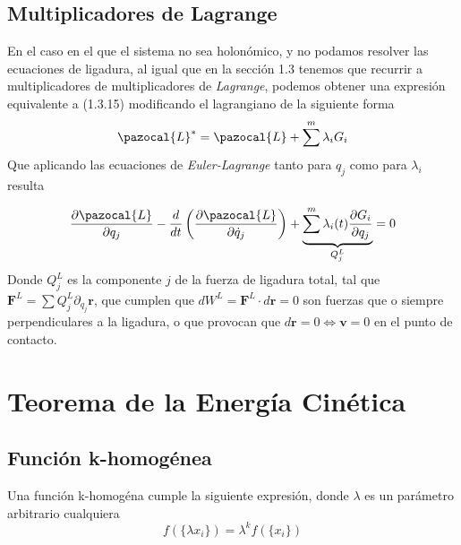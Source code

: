 \subsection{Multiplicadores de Lagrange}
En el caso en el que el sistema no sea holonómico, y no podamos resolver las ecuaciones de ligadura, al igual que en la sección 1.3 tenemos que recurrir a multiplicadores de multiplicadores de \textit{Lagrange}, podemos obtener una expresión equivalente a (1.3.15) modificando el lagrangiano de la siguiente forma
\begin{equation} \label{2.3.4}
    \pazocal{L}^* = \pazocal{L}+\sum^m{\lambda_i G_i}
\end{equation} 
Que aplicando las ecuaciones de \textit{Euler-Lagrange} tanto para $q_j$ como para $\lambda_i$ resulta

\vspace{-10pt}
\Large\begin{equation} \label{2.3.5}
    \frac{\partial \pazocal{L}}{\partial q_j} -\frac{d}{dt}\left(\frac{\partial \pazocal{L}}{\partial \dot{q}_j}\right) +\underbrace{\sum^m\lambda_i(t)\frac{\partial G_i}{\partial q_j}}_{Q^L_j}=0
\end{equation} \normalsize
Donde $Q^L_j$ es la componente $j$ de la fuerza de ligadura total, tal que $\mathbf{F}^L=\sum{Q^L_j \partial_{q_j} \mathbf{r}}$, que cumplen que $dW^L = \mathbf{F}^L\cdot d\mathbf{r}=0$ son fuerzas que o siempre perpendiculares a la ligadura, o que provocan que $d\mathbf{r}=0 \iff \mathbf{v}=0$ en el punto de contacto.

\section{Teorema de la Energía Cinética}
\subsection{Función k-homogénea}
Una función k-homogéna cumple la siguiente expresión, donde $\lambda$ es un parámetro arbitrario cualquiera
\begin{equation} \label{2.4.1}
    f(\{\lambda x_i\})=\lambda^k f(\{x_i\})
\end{equation} 
\vspace{-35pt}
